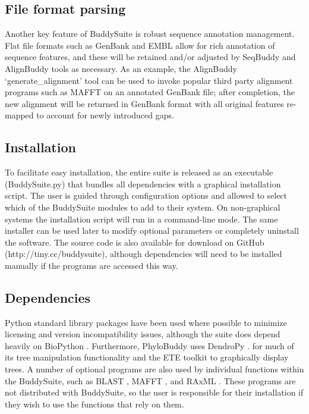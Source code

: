\documentclass[twocolumn]{bmcart}%
\begin{document}
\subsection*{File format parsing}
Another key feature of BuddySuite is robust sequence annotation management. Flat file formats such as GenBank and EMBL allow for rich annotation of sequence features, and these will be retained and/or adjusted by SeqBuddy and AlignBuddy tools as necessary. As an example, the AlignBuddy `generate\_alignment' tool can be used to invoke popular third party alignment programs such as MAFFT \cite{Katoh:2013hm} on an annotated GenBank file; after completion, the new alignment will be returned in GenBank format with all original features re-mapped to account for newly introduced gaps.

\subsection*{Installation}
To facilitate easy installation, the entire suite is released as an executable (BuddySuite.py) that bundles all dependencies with a graphical installation script. The user is guided through configuration options and allowed to select which of the BuddySuite modules to add to their system. On non-graphical systems the installation script will run in a command-line mode. The same installer can be used later to modify optional parameters or completely uninstall the software. The source code is also available for download on GitHub (http://tiny.cc/buddysuite), although dependencies will need to be installed manually if the programs are accessed this way.

\subsection*{Dependencies}
Python standard library packages have been used where possible to minimize licensing and version incompatibility issues, although the suite does depend heavily on BioPython \cite{Cock:2009hj}. Furthermore, PhyloBuddy uses DendroPy \cite{Sukumaran:2010id}. for much of its tree manipulation functionality and the ETE toolkit \cite{HuertaCepas:2010fd} to graphically display trees. A number of optional programs are also used by individual functions within the BuddySuite, such as BLAST \cite{Camacho2009}, MAFFT \cite{Katoh:2013hm}, and RAxML \cite{Stamatakis:2006de}. These programs are not distributed with BuddySuite, so the user is responsible for their installation if they wish to use the functions that rely on them.
\end{document}
